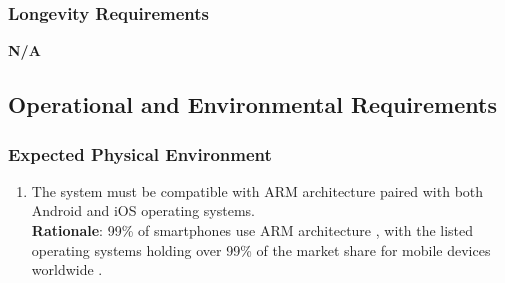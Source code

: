 \subsubsection{Longevity Requirements}
\label{ssub:longevity_requirements}
\textbf{N/A}


\subsection{Operational and Environmental Requirements}
\label{sub:operational_and_environmental_requirements}

\subsubsection{Expected Physical Environment}
\label{ssub:expected_physical_environment}
\begin{enumerate}[{OE-EPE}1. ]
	\item The system must be compatible with ARM architecture paired with both Android and iOS operating systems.
	\\ \textbf{Rationale}: 99\% of smartphones use ARM architecture \cite{ARM2025}, with the listed operating systems holding over 99\% of the market share for mobile devices worldwide \cite{Backlinko2025}.
\end{enumerate}

